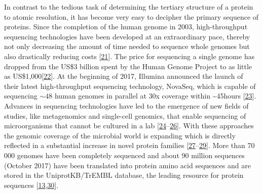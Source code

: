 \documentclass[11pt,a4paper,twoside]{book}
\theoremstyle{definition}
\theoremstyle{definition}
\theoremstyle{remark}
\begin{document}
In contrast to the tedious task of determining the tertiary structure of
a protein to atomic resolution, it has become very easy to decipher the
primary sequence of proteins. Since the completion of the human genome
in 2003, high-throughput sequencing technologies have been developed at
an extraordinary pace, thereby not only decreasing the amount of time
needed to sequence whole genomes but also drastically reducing costs
{[}\protect\hyperlink{ref-Reuter2015}{21}{]}. The price for sequencing a
single genome has dropped from the US\$3 billion spent by the Human
Genome Project to as little as
US\$1,000{[}\protect\hyperlink{ref-Goodwin2016}{22}{]}. At the beginning
of 2017, Illumina announced the launch of their latest high-throughput
sequencing technology, NovaSeq, which is capable of sequencing
\(\sim \! 48\) human genomes in parallel at 30x coverage within
\textasciitilde{}45hours
{[}\protect\hyperlink{ref-NovaSeqSystemSpecifications}{23}{]}. Advances
in sequencing technologies have led to the emergence of new fields of
studies, like metagenomics and single-cell genomics, that enable
sequencing of microorganisms that cannot be cultured in a lab
{[}\protect\hyperlink{ref-Tringe2005}{24}--\protect\hyperlink{ref-Wooley2010}{26}{]}.
With these approaches the genomic coverage of the microbial world is
expanding which is directly reflected in a substantial increase in novel
protein families
{[}\protect\hyperlink{ref-Rinke2013}{27}--\protect\hyperlink{ref-Forster2017}{29}{]}.
More than 70 000 genomes have been completely sequenced and about 90
million sequences (October 2017) have been translated into protein amino
acid sequences and are stored in the UniprotKB/TrEMBL database, the
leading resource for protein sequences
{[}\protect\hyperlink{ref-TheUniProtConsortium2017}{13},\protect\hyperlink{ref-Zerihun2017}{30}{]}.
\end{document}
